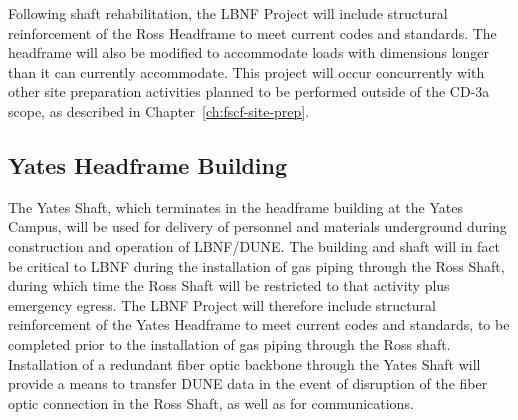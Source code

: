 Following shaft rehabilitation, the LBNF Project will include structural reinforcement of the Ross Headframe to meet current codes and standards.  The headframe will also be modified %
to accommodate loads with dimensions longer than it can currently accommodate.  This project will occur concurrently with other site preparation activities planned to be performed outside of the CD-3a scope, as described in Chapter~\ref{ch:fscf-site-prep}.


\subsection{Yates Headframe Building}
\label{sec:fscf-surf-facil-surface-bldg-yateshead}

The Yates Shaft, which terminates in the headframe building at the Yates Campus, will be used for delivery of personnel and materials underground during construction and operation of LBNF/DUNE.
The building and shaft will in fact be critical to LBNF during the installation of gas piping through the Ross Shaft, during which time the Ross Shaft will be restricted to that activity plus emergency egress.   The LBNF Project will therefore include structural reinforcement of the Yates Headframe to meet current codes and standards, to be completed prior to the installation of gas piping through the Ross shaft. %
Installation of a redundant fiber optic backbone through the Yates Shaft will provide a means to transfer DUNE data in the event of disruption of the fiber optic connection in the Ross Shaft, as well as for communications.




